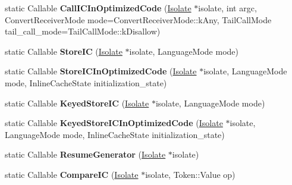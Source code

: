 \begin{DoxyCompactItemize}
\item 
static Callable {\bfseries Call\+I\+C\+In\+Optimized\+Code} (\hyperlink{classv8_1_1internal_1_1_isolate}{Isolate} $\ast$isolate, int argc, Convert\+Receiver\+Mode mode=Convert\+Receiver\+Mode\+::k\+Any, Tail\+Call\+Mode tail\+\_\+call\+\_\+mode=Tail\+Call\+Mode\+::k\+Disallow)\hypertarget{classv8_1_1internal_1_1_code_factory_a4f34594f769ede3d89a6948dbc50e098}{}\label{classv8_1_1internal_1_1_code_factory_a4f34594f769ede3d89a6948dbc50e098}

\item 
static Callable {\bfseries Store\+IC} (\hyperlink{classv8_1_1internal_1_1_isolate}{Isolate} $\ast$isolate, Language\+Mode mode)\hypertarget{classv8_1_1internal_1_1_code_factory_a1c07f423cc0675270ef34700e455889e}{}\label{classv8_1_1internal_1_1_code_factory_a1c07f423cc0675270ef34700e455889e}

\item 
static Callable {\bfseries Store\+I\+C\+In\+Optimized\+Code} (\hyperlink{classv8_1_1internal_1_1_isolate}{Isolate} $\ast$isolate, Language\+Mode mode, Inline\+Cache\+State initialization\+\_\+state)\hypertarget{classv8_1_1internal_1_1_code_factory_af6bc637937f22f37ba9f6a70b8ac36a0}{}\label{classv8_1_1internal_1_1_code_factory_af6bc637937f22f37ba9f6a70b8ac36a0}

\item 
static Callable {\bfseries Keyed\+Store\+IC} (\hyperlink{classv8_1_1internal_1_1_isolate}{Isolate} $\ast$isolate, Language\+Mode mode)\hypertarget{classv8_1_1internal_1_1_code_factory_a2375b5453c1d59e9b8936ae2621cda5d}{}\label{classv8_1_1internal_1_1_code_factory_a2375b5453c1d59e9b8936ae2621cda5d}

\item 
static Callable {\bfseries Keyed\+Store\+I\+C\+In\+Optimized\+Code} (\hyperlink{classv8_1_1internal_1_1_isolate}{Isolate} $\ast$isolate, Language\+Mode mode, Inline\+Cache\+State initialization\+\_\+state)\hypertarget{classv8_1_1internal_1_1_code_factory_ac414529f7295585ba004ce985fec4198}{}\label{classv8_1_1internal_1_1_code_factory_ac414529f7295585ba004ce985fec4198}

\item 
static Callable {\bfseries Resume\+Generator} (\hyperlink{classv8_1_1internal_1_1_isolate}{Isolate} $\ast$isolate)\hypertarget{classv8_1_1internal_1_1_code_factory_a8cfadda62cfb82e66cc05c462a2d73e8}{}\label{classv8_1_1internal_1_1_code_factory_a8cfadda62cfb82e66cc05c462a2d73e8}

\item 
static Callable {\bfseries Compare\+IC} (\hyperlink{classv8_1_1internal_1_1_isolate}{Isolate} $\ast$isolate, Token\+::\+Value op)\hypertarget{classv8_1_1internal_1_1_code_factory_a3dc043c921aca3a8ef9552e50e3cbb7b}{}\label{classv8_1_1internal_1_1_code_factory_a3dc043c921aca3a8ef9552e50e3cbb7b}


\end{DoxyCompactItemize}
